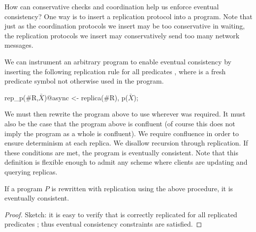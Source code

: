 
How can conservative checks and coordination help us enforce eventual consistency?  One way is to insert a replication protocol into a \lang program.  Note that just as the coordination protocols we insert may be too conservative in waiting, the replication protocols we insert may conservatively send too many network messages.  

We can instrument an arbitrary \lang program to enable eventual consistency by inserting the following replication rule for all predicates , where  is a fresh predicate symbol not otherwise used in the program.

\begin{Dedalus}
rep_p(#R,\(\bar{X}\))@async <- replica(#R), p(\(\bar{X}\));
\end{Dedalus}

We must then rewrite the program above  to use  wherever  was required.  It must also be the case that the program above  is confluent (of course this does not imply the program as a whole is confluent).  We require confluence in order to ensure determinism at each replica.  We disallow recursion through replication.  If these conditions are met, the program is eventually consistent.  Note that this definition is flexible enough to admit any scheme where clients are updating and querying replicas.


\begin{lemma}
If a program $P$ is rewritten with replication using the above procedure, it is eventually consistent.  
\end{lemma}
\begin{proof}
Sketch: it is easy to verify that  is correctly replicated for all replicated predicates ; thus eventual consistency constraints are satisfied.
\end{proof}
